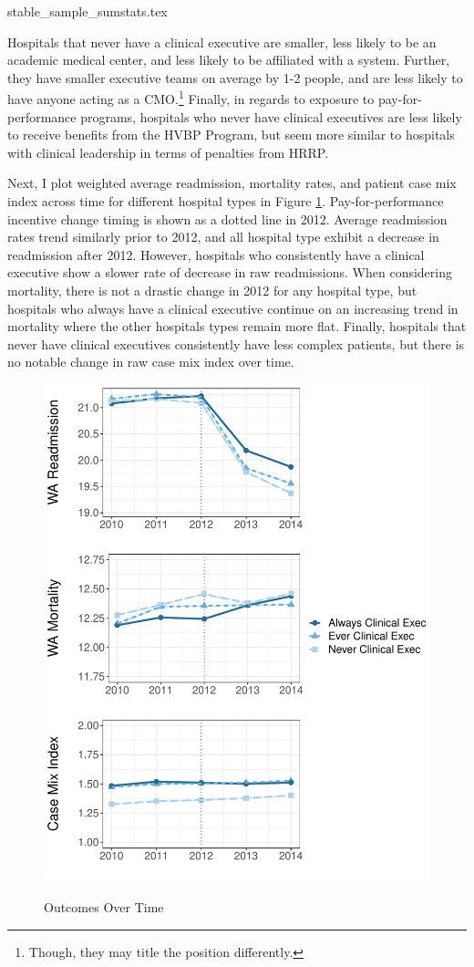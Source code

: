 \documentclass[12pt]{article}
\begin{document}
    {stable_sample_sumstats.tex}

    Hospitals that never have a clinical executive are smaller, less likely to be an academic medical center, and less likely to be affiliated with a system. Further, they have smaller executive teams on average by 1-2 people, and are less likely to have anyone acting as a CMO.\footnote{Though, they may title the position differently.} Finally, in regards to exposure to pay-for-performance programs, hospitals who never have clinical executives are less likely to receive benefits from the HVBP Program, but seem more similar to hospitals with clinical leadership in terms of penalties from HRRP. 

    Next, I plot weighted average readmission, mortality rates, and patient case mix index across time for different hospital types in Figure \ref{fig:outcomes_graph}. Pay-for-performance incentive change timing is shown as a dotted line in 2012. Average readmission rates trend similarly prior to 2012, and all hospital type exhibit a decrease in readmission after 2012. However, hospitals who consistently have a clinical executive show a slower rate of decrease in raw readmissions. When considering mortality, there is not a drastic change in 2012 for any hospital type, but hospitals who always have a clinical executive continue on an increasing trend in mortality where the other hospitals types remain more flat. Finally, hospitals that never have clinical executives consistently have less complex patients, but there is no notable change in raw case mix index over time.

    \begin{figure}[ht!]
    \centering
        \caption{Outcomes Over Time}
        \includegraphics[width=.8\textwidth]{Objects/outcomes_graph.pdf}
        \label{fig:outcomes_graph}
    \end{figure}
\end{document}

